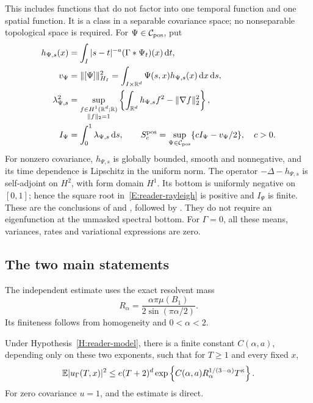 
This includes functions that do not factor into one temporal function and one
spatial function. It is a class in a separable covariance space; no nonseparable
topological space is required. For $\Psi \in \mathcal C_{\mathrm{pos}}$, put
\begin{align}
  h_{\Psi,s}(x)
  &=\int_I|s-t|^{-a}(\Gamma*\Psi_t)(x)\,\mathrm d t,
  \label{E:reader-mean}\\
  v_\Psi&=\|[\Psi]\|_{H_I}^2
  =\int_{I\times\mathbb R^d}\Psi(s,x)h_{\Psi,s}(x)\,\mathrm d x\,\mathrm d s,
  \label{E:reader-action}\\
  \lambda_{\Psi,s}^2
  &=\sup_{\substack{f\in H^1(\mathbb R^d;\mathbb R)\\\|f\|_2=1}}
  \left\{\int_{\mathbb R^d}h_{\Psi,s}f^2-\|\nabla f\|_2^2\right\},
  \label{E:reader-rayleigh}\\
  I_\Psi&=\int_0^1\lambda_{\Psi,s}\,\mathrm d s,\qquad
  S^{\mathrm{pos}}_c=\sup_{\Psi\in\mathcal C_{\mathrm{pos}}}\{cI_\Psi-v_\Psi/2\},\quad c>0.
  \label{E:reader-scores}
\end{align}
For nonzero covariance, $h_{\Psi,s}$ is globally bounded, smooth and
nonnegative, and its time dependence is Lipschitz in the uniform norm. The
operator $-\Delta-h_{\Psi,s}$ is self-adjoint on $H^2$, with form domain $H^1$.
Its bottom is uniformly negative on $[0,1]$; hence the square root
in~\eqref{E:reader-rayleigh} is positive and $I_\Psi$ is finite. These are the
conclusions of  and
, followed by
. They do not require an
eigenfunction at the unmasked spectral bottom. For $\Gamma = 0$, all these
means, variances, rates and variational expressions are zero.

\subsection{The two main statements}

The independent estimate uses the exact resolvent mass
\begin{equation}\label{E:reader-resolvent}
  R_\alpha=\frac{\alpha\pi\mu(B_1)}{2\sin(\pi\alpha/2)}.
\end{equation}
Its finiteness follows from homogeneity and $0 < \alpha < 2$.

\begin{theorem}\label{T:reader-upper}
  Under Hypothesis~\ref{H:reader-model}, there is a finite constant
  $C(\alpha,a)$, depending only on these two exponents, such that for $T \ge 1$
  and every fixed $x$,
  \begin{equation}\label{E:reader-upper}
    \mathbb E|u_\Gamma(T,x)|^2
    \le e(T+2)^d\exp\left\{
    C(\alpha,a)R_\alpha^{1/(3-\alpha)}T^\kappa\right\}.
  \end{equation}
  For zero covariance $u = 1$, and the estimate is direct.
\end{theorem}

